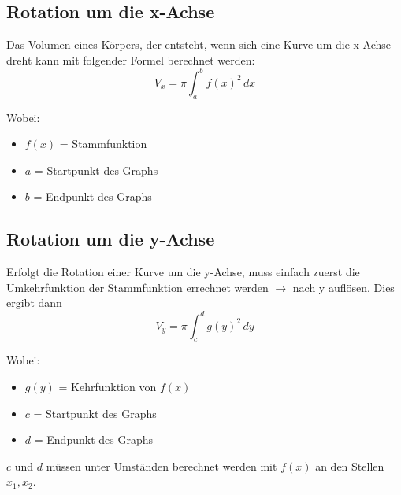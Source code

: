 \documentclass[12pt]{scrartcl}
\begin{document}
\subsection{Rotation um die x-Achse}
Das Volumen eines Körpers, der entsteht, wenn sich eine Kurve um die x-Achse dreht 
kann mit folgender Formel berechnet werden:
\[V_x = \pi \int_{a}^{b}{f(x)^2} \, dx\]

Wobei:
\begin{itemize}
    \item $f(x)$ = Stammfunktion
    \item $a$ = Startpunkt des Graphs
    \item $b$ = Endpunkt des Graphs
\end{itemize}

\subsection{Rotation um die y-Achse}
Erfolgt die Rotation einer Kurve um die y-Achse, muss einfach zuerst die Umkehrfunktion 
der Stammfunktion errechnet werden $\rightarrow$ nach y auflösen. Dies ergibt dann
\[ V_y = \pi \int_{c}^{d}{g(y)^2} \, dy \]

Wobei:
\begin{itemize}
    \item $g(y)$ = Kehrfunktion von $f(x)$
    \item $c$ = Startpunkt des Graphs
    \item $d$ = Endpunkt des Graphs 
\end{itemize}

$c$ und $d$ müssen unter Umständen berechnet werden mit $f(x)$ an den Stellen $x_1, x_2$.



% 
\end{document}
